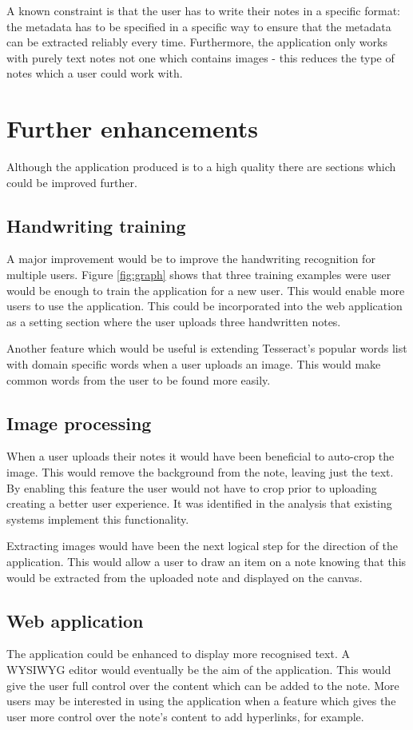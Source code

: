 A known constraint is that the user has to write their notes in a specific format: the metadata has to be specified in a specific way to ensure that the metadata can be extracted reliably every time. Furthermore, the application only works with purely text notes not one which contains images - this reduces the type of notes which a user could work with.

\section{Further enhancements}
Although the application produced is to a high quality there are sections which could be improved further.
\subsection{Handwriting training}
A major improvement would be to improve the handwriting recognition for multiple users. Figure \ref{fig:graph} shows that three training examples were user would be enough to train the application for a new user. This would enable more users to use the application. This could be incorporated into the web application as a setting section where the user uploads three handwritten notes.

Another feature which would be useful is extending Tesseract's popular words list with domain specific words when a user uploads an image. This would make common words from the user to be found more easily.
\subsection{Image processing}

When a user uploads their notes it would have been beneficial to auto-crop the image. This would remove the background from the note, leaving just the text. By enabling this feature the user would not have to crop prior to uploading creating a better user experience. It was identified in the analysis that existing systems implement this functionality.

Extracting images would have been the next logical step for the direction of the application. This would allow a user to draw an item on a note knowing that this would be extracted from the uploaded note and displayed on the canvas.

\subsection{Web application}
The application could be enhanced to display more recognised text. A WYSIWYG editor would eventually be the aim of the application. This would give the user full control over the content which can be added to the note. More users may be interested in using the application when a feature which gives the user more control over the note's content to add hyperlinks, for example.


